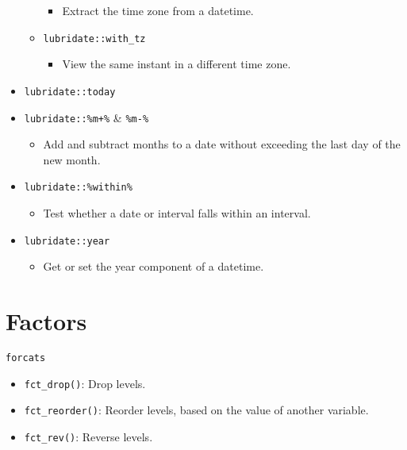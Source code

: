 \documentclass[
]{book}
\providecommand{\tightlist}{%
  \setlength{\itemsep}{0pt}\setlength{\parskip}{0pt}}
\begin{document}
\begin{itemize}
\begin{itemize}
    \begin{itemize}
    \tightlist
    \item
      Extract the time zone from a datetime.
    \end{itemize}
  \item
    \texttt{lubridate::with\_tz}

    \begin{itemize}
    \tightlist
    \item
      View the same instant in a different time zone.
    \end{itemize}
  \end{itemize}
\item
  \texttt{lubridate::today}
\item
  \texttt{lubridate::\%m+\%} \& \texttt{\%m-\%}

  \begin{itemize}
  \tightlist
  \item
    Add and subtract months to a date without exceeding the last day of the new month.
  \end{itemize}
\item
  \texttt{lubridate::\%within\%}

  \begin{itemize}
  \tightlist
  \item
    Test whether a date or interval falls within an interval.
  \end{itemize}
\item
  \texttt{lubridate::year}

  \begin{itemize}
  \tightlist
  \item
    Get or set the year component of a datetime.
  \end{itemize}
\end{itemize}

\hypertarget{factors}{%
\section{Factors}\label{factors}}

\texttt{forcats}

\begin{itemize}
\tightlist
\item
  \texttt{fct\_drop()}: Drop levels.
\item
  \texttt{fct\_reorder()}: Reorder levels, based on the value of another variable.
\item
  \texttt{fct\_rev()}: Reverse levels.
\end{itemize}
\end{document}
